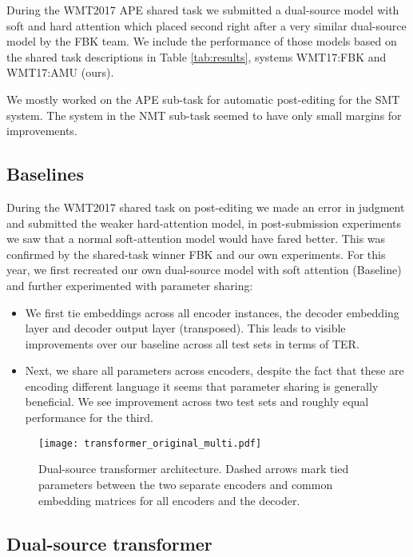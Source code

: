 \documentclass[11pt,a4paper]{article}
\begin{document}
During the WMT2017 APE shared task we submitted a dual-source model with soft and hard attention which placed second right after a very similar dual-source model by the FBK team. We include the performance of those models based on the shared task descriptions in Table \ref{tab:results}, systems WMT17:FBK and WMT17:AMU (ours).

We mostly worked on the APE sub-task for automatic post-editing for the SMT system. The system in the NMT sub-task seemed to have only small margins for improvements. 

\subsection{Baselines}

During the WMT2017 shared task on post-editing we made an error in judgment and submitted the weaker hard-attention model, in post-submission experiments we saw that a normal soft-attention model would have fared better. This was confirmed by the shared-task winner FBK and our own experiments. For this year, we first recreated our own dual-source model with soft attention (Baseline) and further experimented with parameter sharing:
\begin{itemize}
\item We first tie embeddings across all encoder instances, the decoder embedding layer and decoder output layer (transposed). This leads to visible improvements over our baseline across all test sets in terms of TER. 
\item Next, we share all parameters across encoders, despite the fact that these are encoding different language it seems that parameter sharing is generally beneficial. We see improvement across two test sets and roughly equal performance for the third. 
\end{itemize}

\begin{figure}[t]
\centering
\texttt{[image: transformer\_original\_multi.pdf]}
\caption{Dual-source transformer architecture. Dashed arrows mark tied parameters between the two separate encoders and common embedding matrices for all encoders and the decoder.} \label{dual}
\end{figure}

\subsection{Dual-source transformer}
\end{document}
